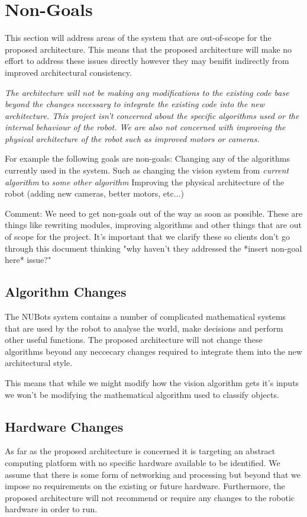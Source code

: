 \documentclass[english,12pt]{scrartcl}
\begin{document}
	\section{Non-Goals}
		This section will address areas of the system that are out-of-scope for the proposed architecture.
		This means that the proposed architecture will make no effort to address these issues directly however
		they may benifit indirectly from improved architectural consistency.
		
		{
		\em %
		The architecture will not be making any modifications to the existing code base beyond the
		changes necessary to integrate the existing code into the new architecture. This project
		isn't concerned about the specific algorithms used or the internal behaviour of the robot.
		We are also not concerned with improving the physical architecture of the robot such as
		improved motors or cameras.

		For example the following goals are non-goals:
		Changing any of the algorithms currently used in the system. Such as changing the vision
		system from \emph{current algorithm} to \emph{some other algorithm} Improving the physical
		architecture of the robot (adding new cameras, better motors, etc...)

		Comment: We need to get non-goals out of the way as soon as possible. These are things like
		rewriting modules, improving algorithms and other things that are out of scope for the
		project. It's important that we clarify these so clients don't go through this document
		thinking "why haven't they addressed the *insert non-goal here* issue?"
		}

		\subsection{Algorithm Changes}
			The NUBots system contains a number of complicated mathematical systems that are used by the robot
			to analyse the world, make decisions and perform other useful functions. 
			The proposed architecture will not change these algorithms beyond any neccecary changes required to
			integrate them into the new architectural style.
			
			This means that while we might modify how the vision algorithm gets it's inputs we won't be modifying the
			mathematical algorithm used to classify objects.

		\subsection{Hardware Changes}
			As far as the proposed architecture is concerned it is targeting an abstract computing platform with no specific hardware
			available to be identified. 
			We assume that there is some form of networking and processing but beyond that we impose no requirements on the
			existing or future hardware. Furthermore, the proposed architecture will not recommend or require any changes to the robotic
			hardware in order to run.
\end{document}
